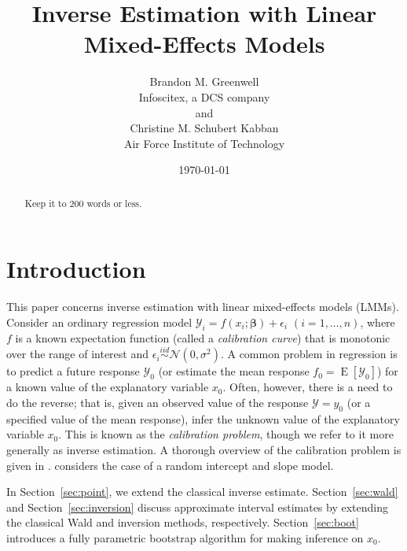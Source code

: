 \documentclass{article}\usepackage[]{graphicx}\usepackage[]{color}
\title{Inverse Estimation with Linear Mixed-Effects Models}
\author{Brandon M. Greenwell\\Infoscitex, a DCS company \\ and \\
        Christine M. Schubert Kabban\\Air Force Institute of Technology}
\date{\today}
\newcommand{\E}{\operatorname{E}}
\begin{document}
\maketitle





\begin{abstract}
Keep it to 200 words or less.
\end{abstract}


\section{Introduction}

This paper concerns inverse estimation with linear mixed-effects models (LMMs). Consider an ordinary regression model $\mathcal{Y}_i = f\left(x_i; \bm{\beta} \right) + \epsilon_i$ $(i = 1, \dotsc, n)$, where $f$ is a known expectation function (called a \emph{calibration curve}) that is monotonic over the range of interest and $\epsilon_i \stackrel{iid}{\sim} \mathcal{N}\left( 0, \sigma^2 \right)$.  A common problem in regression is to predict a future response $\mathcal{Y}_0$ (or estimate the mean response $f_0 = \E\left[\mathcal{Y}_0\right]$) for a known value of the explanatory variable $x_0$.  Often, however, there is a need to do the reverse; that is, given an observed value of the response $\mathcal{Y} = y_0$ (or a specified value of the mean response), infer the unknown value of the explanatory variable $x_0$.  This is known as the \emph{calibration problem}, though we refer to it more generally as inverse estimation.  A thorough overview of the calibration problem is given in \citet{osborne-statistical-1991}.  \citet{oman-calibration-1998} considers the case of a random intercept and slope model. 

In Section~\ref{sec:point}, we extend the classical inverse estimate. Section~\ref{sec:wald} and Section~\ref{sec:inversion} discuss approximate interval estimates by extending the classical Wald and inversion methods, respectively. Section~\ref{sec:boot} introduces a fully parametric bootstrap algorithm for making inference on $x_0$. 


\end{document}
